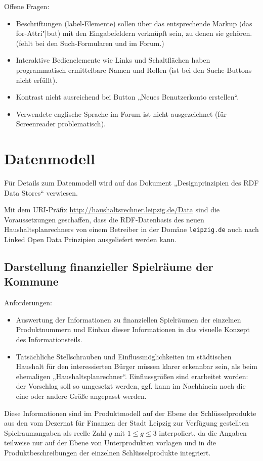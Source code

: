 \documentclass[11pt,a4paper,twoside]{article}
\begin{document}
Offene Fragen:
\begin{itemize}
\item Beschriftungen (label-Elemente) sollen über das entsprechende Markup
  (das for-Attri"|but) mit den Eingabefeldern verknüpft sein, zu denen sie
  gehören. (fehlt bei den Such-Formularen und im Forum.)
\item Interaktive Bedienelemente wie Links und Schaltflächen haben
  programmatisch ermittelbare Namen und Rollen (ist bei den Suche-Buttons
  nicht erfüllt).
\item Kontrast nicht ausreichend bei Button „Neues Benutzerkonto erstellen“.
\item Verwendete englische Sprache im Forum ist nicht ausgezeichnet (für
  Screenreader problematisch).
\end{itemize}

\section{Datenmodell}

Für Details zum Datenmodell wird auf das Dokument „Designprinzipien des RDF
Data Stores“ verwiesen.

Mit dem URI-Präfix \url{http://haushaltsrechner.leipzig.de/Data} sind die
Voraussetzungen geschaffen, dass die RDF-Datenbasis des neuen
Haushaltsplanrechners von einem Betreiber in der Domäne \texttt{leipzig.de}
auch nach Linked Open Data Prinzipien ausgeliefert werden kann.

\subsection{Darstellung finanzieller Spielräume der Kommune}

Anforderungen:
\begin{itemize}\itemsep0pt
\item Auswertung der Informationen zu finanziellen Spielräumen der einzelnen
  Produktnummern und Einbau dieser Informationen in das visuelle Konzept des
  Informationsteils. 
\item Tatsächliche Stellschrauben und Einflussmöglichkeiten im städtischen
  Haushalt für den interessierten Bürger müssen klarer erkennbar sein, als
  beim ehemaligen „Haushaltsplanrechner“. Einflussgrößen sind erarbeitet
  worden: der Vorschlag soll so umgesetzt werden, ggf. kann im Nachhinein noch
  die eine oder andere Größe angepasst werden.
\end{itemize}

Diese Informationen sind im Produktmodell auf der Ebene der Schlüsselprodukte
aus den vom Dezernat für Finanzen der Stadt Leipzig zur Verfügung gestellten
Spielraumangaben als reelle Zahl $g$ mit $1\le g\le 3$ interpoliert, da die
Angaben teilweise nur auf der Ebene von Unterprodukten vorlagen und in die
Produktbeschreibungen der einzelnen Schlüsselprodukte integriert.
\end{document}
